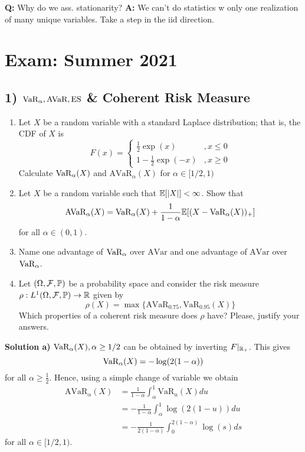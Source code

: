\textbf{Q:}
Why do we ass. stationarity?
\textbf{A:} We can't do statistics w only one realization of many unique variables. Take a step in the iid direction.



%
%
\section*{Exam: Summer 2021}

%
%
\subsection*{1) $\text{VaR}_\alpha, \text{AVaR}, \text{ES}$ \& Coherent Risk Measure}
\begin{enumerate}[label=(\alph*)]
    \item Let $X$ be a random variable with a standard Laplace distribution; that is, the CDF of $X$ is
    \[
        F(x) =
            \begin{cases}
                \frac{1}{2}\exp(x) \quad &, x\leq 0\\
                1 - \frac{1}{2}\exp(-x) &, x \geq 0
            \end{cases}
    \]
    Calculate $\text{VaR}_\alpha(X)$ and $\text{AVaR}_\alpha(X)$ for $\alpha \in [1/2, 1)$
    \item Let $X$ be a random variable such that $\mathbb{E}[|X|] < \infty$. Show that
    \[
        \text{AVaR}_\alpha(X) = \text{VaR}_\alpha(X)
        + \frac{1}{1-\alpha} \mathbb{E}[(X - \text{VaR}_\alpha(X))_+]
    \]
    for all $\alpha \in (0, 1)$.
    \item Name one advantage of $\text{VaR}_\alpha$ over $\text{AVar}$ and one advantage of $\text{AVar}$ over $\text{VaR}_\alpha$.
    \item Let $(\Omega, \mathcal{F}, \mathbb{P})$ be a probability space and consider the risk measure $\rho: L^1(\Omega, \mathcal{F}, \mathbb{P}) \to \mathbb {\mathbb{R}}$ given by
    \[
        \rho(X) = \max\{\text{AVaR}_{0.75}, \text{VaR}_{0.95}(X)\}
    \]
    Which properties of a coherent risk measure does $\rho$ have? Please, justify your answers.
\end{enumerate}

\textbf{Solution a)} $\text{VaR}_\alpha(X), \alpha \geq 1/2$ can be obtained by inverting $F|_{\mathbb{R}_+}$. This gives
\[
    \text{VaR}_\alpha(X) = -\log(2(1-\alpha))
\]
for all $\alpha \geq \frac{1}{2}$. Hence, using a simple change of variable we obtain
\begin{align*}
    \text{AVaR}_\alpha(X) &= \frac{1}{1-\alpha}\int_\alpha^1 \text{VaR}_u(X) du \\
    &= -\frac{1}{1-\alpha}\int_\alpha^1 \log(2(1-u))du \\
    &= - \frac{1}{2(1-\alpha)}\int_0^{2(1-\alpha)} \log(s) ds
\end{align*}
for all $\alpha\in[1/2,1)$.

